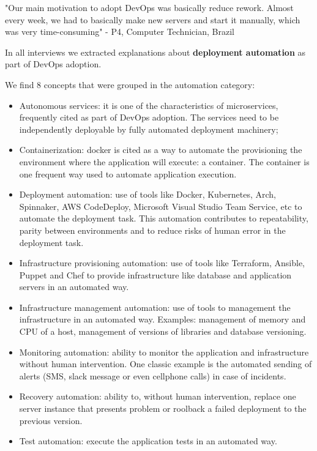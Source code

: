 "Our main motivation to adopt DevOps was basically reduce rework. Almost every
week, we had to basically make new servers and start it manually, which was
very time-consuming" - P4, Computer Technician, Brazil

In all interviews we extracted explanations about \textbf{deployment 
automation} as part of DevOps adoption.

We find 8 concepts that were grouped in the automation category:

\begin{itemize}
\item Autonomous services: it is one of the characteristics of microservices,
frequently cited as part of DevOps adoption. The services need to be
independently deployable by fully automated deployment machinery;

\item Containerization: docker is cited as a way to automate the provisioning
the environment where the application will execute: a container. The container
is one frequent way used to automate application execution.

\item Deployment automation: use of tools like Docker, Kubernetes, Arch,
Spinnaker, AWS CodeDeploy, Microsoft Visual Studio Team Service, etc to
automate the deployment task. This automation contributes to repeatability,
parity between environments and to reduce risks of human error in the
deployment task.

\item Infrastructure provisioning automation: use of tools like Terraform,
Ansible, Puppet and Chef to provide infrastructure like database and
application servers in an automated way.

\item Infrastructure management automation: use of tools to management the
infrastructure in an automated way. Examples: management of memory and CPU of
a host, management of versions of libraries and database versioning.

\item Monitoring automation: ability to monitor the application and
infrastructure without human intervention. One classic example is the
automated sending of alerts (SMS, slack message or even cellphone calls) in
case of incidents.

\item Recovery automation: ability to, without human intervention, replace one server instance that presents problem or roolback a failed deployment to the previous version.

\item Test automation: execute the application tests in an automated way.
\end{itemize}

